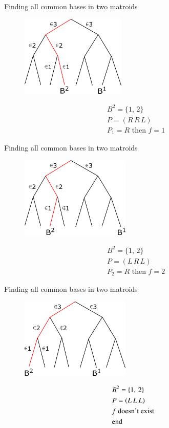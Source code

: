 \documentclass[11pt,xcolor=dvipsnames,table,dvipdfmx]{beamer}
\begin{document}
\begin{frame}{Finding all common bases in two matroids}
 \begin{figure}
  \centering
  \hspace{0.03cm}
  \includegraphics[width=5cm]{text4989-4.png}
 \end{figure}
 \begin{align*}
  &B^2 = \{1,\,2\}\\
  &P = (R\,R\,L)\\
  &P_1 = R \text{ then } f = 1
 \end{align*}
\end{frame}

\begin{frame}{Finding all common bases in two matroids}
 \begin{figure}
  \centering
  \hspace{0.2cm}
  \includegraphics[width=5.2cm]{text4989-5.png}
 \end{figure}
 \begin{align*}
  &B^2 = \{1,\,2\}\\
  &P = (L\,R\,L)\\
  &P_2 = R \text{ then } f = 2
 \end{align*}
\end{frame}

\begin{frame}{Finding all common bases in two matroids}
 \begin{figure}
  \centering
  \hspace{-0.2cm}
  \includegraphics[width=5.2cm]{text4989-6.png}
 \end{figure}
 \begin{align*}
  &B^2 = \{1,\,2\}\\
  &P = (L\,L\,L)\\
  &f \text{ doesn't exist}\\
  &\text{end}
  \hspace{-0.1cm}
 \end{align*}
\end{frame}
\end{document}
